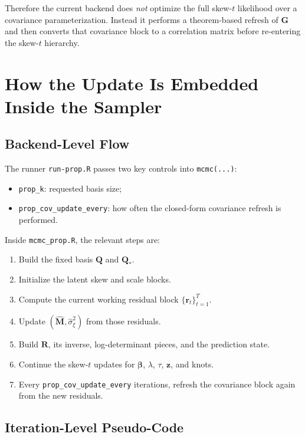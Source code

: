 \documentclass[11pt]{article}
\newcommand{\bQ}{\mathbf{Q}}
\newcommand{\bR}{\mathbf{R}}
\newcommand{\bG}{\mathbf{G}}
\newcommand{\bM}{\mathbf{M}}
\newcommand{\bz}{\mathbf{z}}
\newcommand{\br}{\mathbf{r}}
\begin{document}
Therefore the current backend does \emph{not} optimize the full skew-$t$
likelihood over a covariance parameterization. Instead it performs a theorem-based
refresh of \(\bG\) and then converts that covariance block to a correlation
matrix before re-entering the skew-$t$ hierarchy.

\section{How the Update Is Embedded Inside the Sampler}

\subsection{Backend-Level Flow}

The runner \texttt{run-prop.R} passes two key controls into
\texttt{mcmc(...)}:

\begin{itemize}
\item \texttt{prop\_k}: requested basis size;
\item \texttt{prop\_cov\_update\_every}: how often the closed-form covariance
refresh is performed.
\end{itemize}

Inside \texttt{mcmc\_prop.R}, the relevant steps are:

\begin{enumerate}[label=\arabic*.]
\item Build the fixed basis \(\bQ\) and \(\bQ_*\).
\item Initialize the latent skew and scale blocks.
\item Compute the current working residual block
\(\{\br_t\}_{t=1}^T\).
\item Update \((\widehat{\bM}, \widehat{\sigma}_\xi^2)\) from those residuals.
\item Build \(\bR\), its inverse, log-determinant pieces, and the prediction
state.
\item Continue the skew-$t$ updates for \(\bm{\beta}\), \(\lambda\), \(\tau\),
\(\bz\), and knots.
\item Every \texttt{prop\_cov\_update\_every} iterations, refresh the
covariance block again from the new residuals.
\end{enumerate}

\subsection{Iteration-Level Pseudo-Code}
\end{document}
